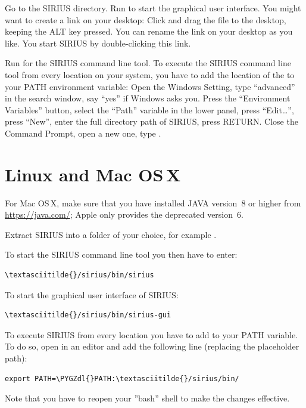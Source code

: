 \documentclass[letterpaper,10pt,openany,oneside]{sphinxmanual}
\def\PYGZdl{\char`\$}
\begin{document}
Go to the SIRIUS directory.  Run  to start the
graphical user interface.  You might want to create a link on your desktop:
Click and drag the file  to the desktop, keeping the
ALT key pressed.  You can rename the link on your desktop as you like.  You
start SIRIUS by double-clicking this link.

Run  for the SIRIUS command line tool.  To
execute the SIRIUS command line tool from every location on your system,
you have to add the location of the  to your PATH
environment variable: Open the Windows Setting, type ``advanced'' in the
search window, say ``yes'' if Windows asks you.  Press the ``Environment
Variables'' button, select the ``Path'' variable in the lower panel, press
``Edit\dots'', press ``New'', enter the full directory path of SIRIUS,
press RETURN.  Close the Command Prompt, open a new one,
type .


\section{Linux and Mac OS\,X}
\label{install:linux-and-macosx}

For Mac OS\,X, make sure that you have installed JAVA version~8 or higher
from \url{https://java.com/}; Apple only provides the deprecated version~6.

Extract SIRIUS into a folder of your choice, for example .

To start the SIRIUS command line tool you then have to enter:
\begin{Verbatim}[commandchars=\\\{\}]
\textasciitilde{}/sirius/bin/sirius
\end{Verbatim}

To start the graphical user interface of SIRIUS:
\begin{Verbatim}[commandchars=\\\{\}]
\textasciitilde{}/sirius/bin/sirius-gui
\end{Verbatim}

To execute SIRIUS from every location you have to add 
to your PATH variable. To do so, open  in an 
editor and add the following line (replacing the placeholder path):
\begin{Verbatim}[commandchars=\\\{\}]
export PATH=\PYGZdl{}PATH:\textasciitilde{}/sirius/bin/
\end{Verbatim}
Note that you have to reopen your ''bash'' shell to make the changes effective.
\end{document}
